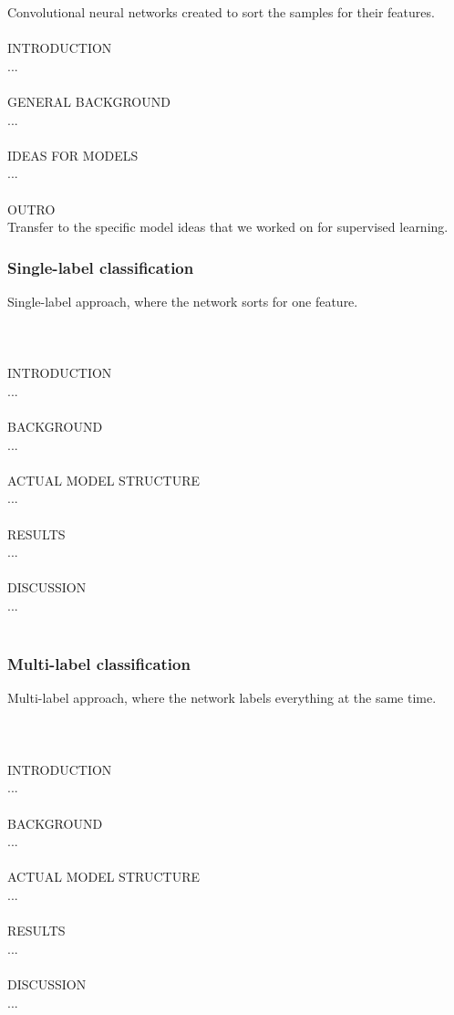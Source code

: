 Convolutional neural networks created to sort the samples for their features. \\
\\
INTRODUCTION \\
... \\
\\
GENERAL BACKGROUND \\
... \\
\\
IDEAS FOR MODELS \\
... \\
\\
OUTRO \\
Transfer to the specific model ideas that we worked on for supervised learning.

\subsubsection{Single-label classification}

Single-label approach, where the network sorts for one feature. \\
\\
\\
\\
INTRODUCTION \\
... \\
\\
BACKGROUND \\
... \\
\\
ACTUAL MODEL STRUCTURE \\
... \\
\\
RESULTS \\
... \\
\\
DISCUSSION \\
... \\
\\

\subsubsection{Multi-label classification}

Multi-label approach, where the network labels everything at the same time. \\
\\
\\
\\
INTRODUCTION \\
... \\
\\
BACKGROUND \\
... \\
\\
ACTUAL MODEL STRUCTURE \\
... \\
\\
RESULTS \\
... \\
\\
DISCUSSION \\
... \\
\\


